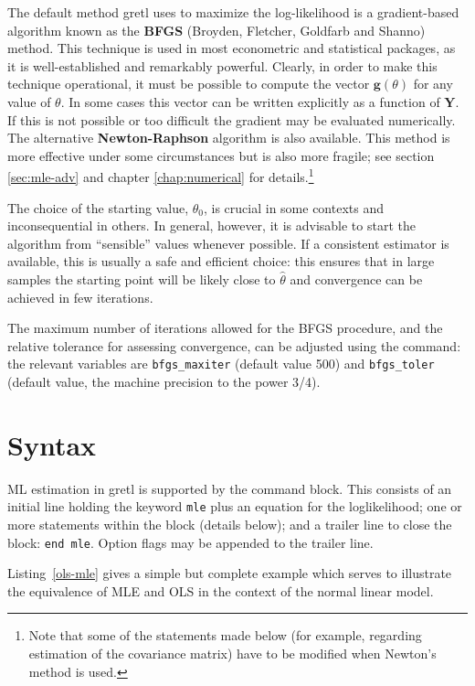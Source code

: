 The default method gretl uses to maximize the log-likelihood is a
gradient-based algorithm known as the \textbf{BFGS} (Broyden,
Fletcher, Goldfarb and Shanno) method. This technique is used in most
econometric and statistical packages, as it is well-established and
remarkably powerful. Clearly, in order to make this technique
operational, it must be possible to compute the vector
$\mathbf{g}(\theta)$ for any value of $\theta$. In some cases this
vector can be written explicitly as a function of $\mathbf{Y}$. If
this is not possible or too difficult the gradient may be evaluated
numerically. The alternative \textbf{Newton-Raphson} algorithm is also
available. This method is more effective under some circumstances but
is also more fragile; see section \ref{sec:mle-adv} and chapter
\ref{chap:numerical} for details.\footnote{Note that some of the
  statements made below (for example, regarding estimation of the
  covariance matrix) have to be modified when Newton's method is
  used.}

The choice of the starting value, $\theta_0$, is crucial in some contexts
and inconsequential in others. In general, however, it is
advisable to start the algorithm from ``sensible'' values whenever
possible. If a consistent estimator is available, this is usually a
safe and efficient choice: this ensures that in large samples the
starting point will be likely close to $\hat{\theta}$ and convergence
can be achieved in few iterations. 

The maximum number of iterations allowed for the BFGS procedure, and
the relative tolerance for assessing convergence, can be adjusted
using the  command: the relevant variables are
\verb+bfgs_maxiter+ (default value 500) and \verb+bfgs_toler+ (default
value, the machine precision to the power 3/4).

\section{Syntax}
\label{sec:ml-syntax}

ML estimation in gretl is supported by the  command
block. This consists of an initial line holding the keyword
\texttt{mle} plus an equation for the loglikelihood; one or more
statements within the block (details below); and a trailer line to
close the block: \texttt{end mle}. Option flags may be appended to the
trailer line.

Listing~\ref{ols-mle} gives a simple but complete example which serves
to illustrate the equivalence of MLE and OLS in the context of the
normal linear model.

